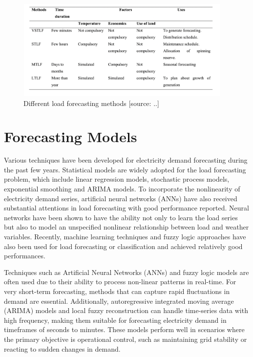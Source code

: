 \documentclass[mstat,12pt]{unswthesis}
\begin{document}
\begin{figure}[H]
\centering
\includegraphics[width=0.95\textwidth, height=5cm]{diff_load_forecasting_methods.png}
\caption{Different load forecasting methods [source: ..]}\label{load_forecasting_methods}
\end{figure}

\section{Forecasting Models}\label{forecasting-models}

Various techniques have been developed for electricity demand
forecasting during the past few years. Statistical models are widely
adopted for the load forecasting problem, which include linear
regression models, stochastic process models, exponential smoothing and
ARIMA models. To incorporate the nonlinearity of electricity demand
series, artificial neural networks (ANNs) have also received substantial
attentions in load forecasting with good performance reported. Neural
networks have been shown to have the ability not only to learn the load
series but also to model an unspecified nonlinear relationship between
load and weather variables. Recently, machine learning techniques and
fuzzy logic approaches have also been used for load forecasting or
classification and achieved relatively good performances.

Techniques such as Artificial Neural Networks (ANNs) and fuzzy logic
models are often used due to their ability to process non-linear
patterns in real-time. For very short-term forecasting, methods that can
capture rapid fluctuations in demand are essential. Additionally,
autoregressive integrated moving average (ARIMA) models and local fuzzy
reconstruction can handle time-series data with high frequency, making
them suitable for forecasting electricity demand in timeframes of
seconds to minutes. These models perform well in scenarios where the
primary objective is operational control, such as maintaining grid
stability or reacting to sudden changes in demand.
\end{document}

